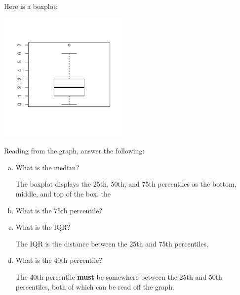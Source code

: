 




Here is a boxplot:


\centerline{\includegraphics[width=2.5in]{Figures/AC128-plot1.pdf}}
\bigskip

Reading from the graph, answer the following:

\begin{enumerate}[(a)]
\item What is the median?


\begin{AnswerText}
The boxplot displays the 25th, 50th, and 75th percentiles as the
bottom, middle, and top of the box.  
the 
\end{AnswerText}

\item What is the 75th percentile?


\item What is the IQR?


\begin{AnswerText}
The IQR is the distance between the 25th and 75th percentiles.
\end{AnswerText}

\item What is the 40th percentile?
\begin{MultipleChoice}
\end{MultipleChoice}

\begin{AnswerText}
The 40th percentile {\bf must} be somewhere between the 25th and 50th
percentiles, both of which can be read off the graph.
\end{AnswerText}


\end{enumerate}


